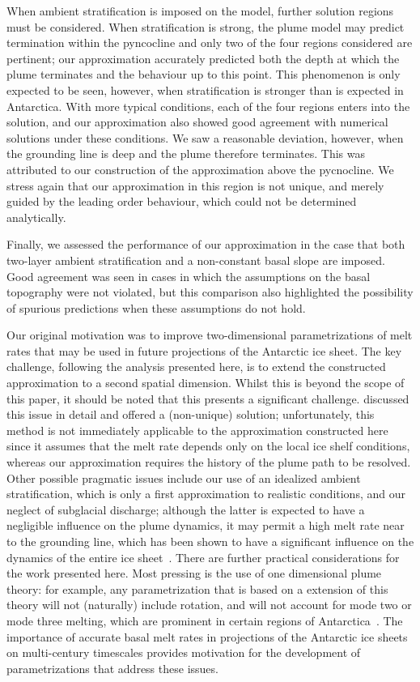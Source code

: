 \documentclass{jfm}
\begin{document}
When ambient stratification is imposed on the model, further solution regions must be considered. When stratification is strong, the plume model may predict termination within the pyncocline and only two of the four regions considered are pertinent; our approximation accurately predicted both the depth at which the plume terminates and the behaviour up to this point. This phenomenon is only expected to be seen, however, when stratification is stronger than is expected in Antarctica. With more typical conditions, each of the four regions enters into the solution, and our approximation also showed good agreement with numerical solutions under these conditions. We saw a reasonable deviation, however, when the grounding line is deep and the plume therefore terminates. This was attributed to our construction of the approximation above the pycnocline. We stress again that our approximation in this region is not unique, and merely guided by the leading order behaviour, which could not be determined analytically. 

Finally, we assessed the performance of our approximation in the case that both two-layer ambient stratification and a non-constant basal slope are imposed. Good agreement was seen in cases in which the assumptions on the basal topography were not violated, but this comparison also highlighted the possibility of spurious predictions when these assumptions do not hold.

Our original motivation was to improve two-dimensional parametrizations of melt rates that may be used in future projections of the Antarctic ice sheet. The key challenge, following the analysis presented here, is to extend the constructed approximation to a second spatial dimension. Whilst this is beyond the scope of this paper, it should be noted that this presents a significant challenge. \citet{Lazeroms2018TheCryo} discussed this issue in detail and offered a (non-unique) solution; unfortunately, this method is not immediately applicable to the approximation constructed here since it assumes that the melt rate depends only on the local ice shelf conditions, whereas our approximation requires the history of the plume path to be resolved. Other possible pragmatic issues include our use of an idealized ambient stratification, which is only a first approximation to realistic conditions, and our neglect of subglacial discharge; although the latter is expected to have a negligible influence on the plume dynamics, it may permit a high melt rate near to the grounding line, which has been shown to have a significant influence on the dynamics of the entire ice sheet~\citep{Arthern2017GRL}. There are further practical considerations for the work presented here. Most pressing is the use of one dimensional plume theory: for example, any parametrization that is based on a extension of this theory will not (naturally) include rotation, and will not account for mode two or mode three melting, which are prominent in certain regions of Antarctica~\citep{Adusumilli2020NatureGeo}. The importance of accurate basal melt rates in projections of the Antarctic ice sheets on multi-century timescales provides motivation for the development of parametrizations that address these issues. 
\end{document}
